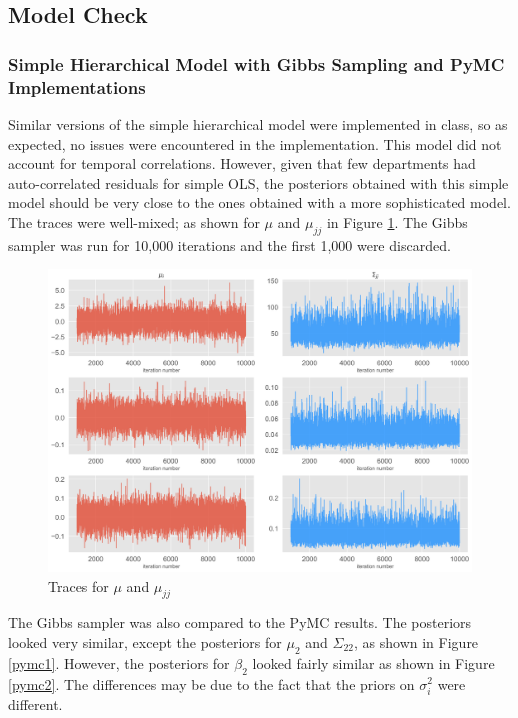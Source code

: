 \documentclass[paper=a4, fontsize=11pt]{scrartcl}
\begin{document}
\subsection{Model Check}

\subsubsection{Simple Hierarchical Model with Gibbs Sampling and PyMC Implementations}
Similar versions of the simple hierarchical model were implemented in class, so as expected, no issues were encountered in the implementation. This model did not account for temporal correlations. However, given that few departments had auto-correlated residuals for simple OLS, the posteriors obtained with this simple model should be very close to the ones obtained with a more sophisticated model. The traces were well-mixed; as shown for $\mu$ and $\mu_{jj}$ in Figure  \ref{traces}. The Gibbs sampler was run for 10,000 iterations and the first 1,000 were discarded.\\

\begin{figure}[!htb]\label{traces}
\centering
\includegraphics[width=1\textwidth]{project/writeup/traces_simple_model.png}
\caption{Traces for $\mu$ and $\mu_{jj}$}
\end{figure}


The Gibbs sampler was also compared to the PyMC results. The posteriors looked very similar, except the posteriors for $\mu_2$ and $\Sigma_{22}$, as shown in Figure \ref{pymc1}. However, the posteriors for $\beta_2$ looked fairly similar as shown in Figure \ref{pymc2}. The differences may be due to the fact that the priors on $\sigma^2_i$ were different.
\end{document}
